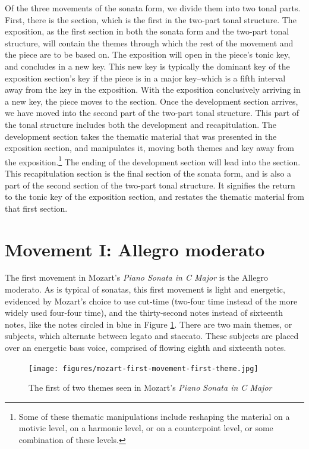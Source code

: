 Of the three movements of the sonata form, we divide them into two tonal parts. First, there is the  section, which is the first in the two-part tonal structure. The exposition, as the first section in both the sonata form and the two-part tonal structure, will contain the themes through which the rest of the movement and the piece are to be based on. The exposition will open in the piece's tonic key, and concludes in a new key. This new key is typically the dominant key of the exposition section's key if the piece is in a major key\autocite{Webster_2001}--which is a fifth interval away from the key in the exposition. With the exposition conclusively arriving in a new key, the piece moves to the  section. Once the development section arrives, we have moved into the second part of the two-part tonal structure. This part of the tonal structure includes both the development and recapitulation\autocite{Webster_2001}. The development section takes the thematic material that was presented in the exposition section, and manipulates it, moving both themes and key away from the exposition.\footnote{Some of these thematic manipulations include reshaping the material on a motivic level, on a harmonic level, or on a counterpoint level, or some combination of these levels.} The ending of the development section will lead into the  section. This recapitulation section is the final section of the sonata form, and is also a part of the second section of the two-part tonal structure. It signifies the return to the tonic key of the exposition section\autocite{Webster_2001}, and restates the thematic material from that first section.

\section{Movement I: Allegro moderato}
The first movement in Mozart's \textit{Piano Sonata in C Major} is the Allegro moderato. As is typical of sonatas, this first movement is light and energetic, evidenced by Mozart's choice to use cut-time (two-four time instead of the more widely used four-four time), and the thirty-second notes instead of sixteenth notes, like the notes circled in blue in Figure \ref{fig:mozart-first-movement-first-theme}\autocite{Henle_1977}. There are two main themes, or subjects, which alternate between legato and staccato. These subjects are placed over an energetic bass voice, comprised of flowing eighth and sixteenth notes.

\begin{figure}
    \centering
    \texttt{[image: figures/mozart-first-movement-first-theme.jpg]}
    \caption{The first of two themes seen in Mozart's \textit{Piano Sonata in C Major}}
    \label{fig:mozart-first-movement-first-theme}
\end{figure}


